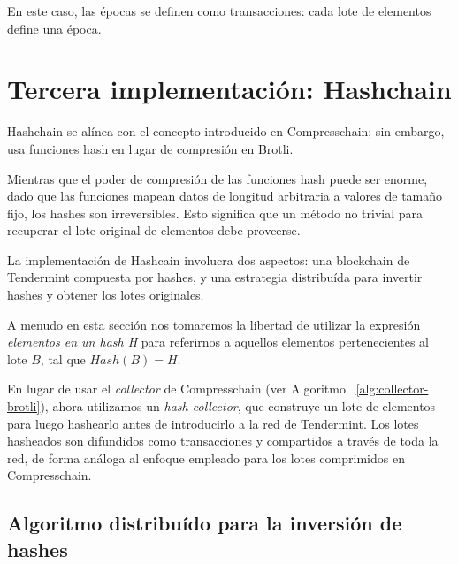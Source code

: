 %
En este caso, las épocas se definen como transacciones: cada lote de elementos define una época.


\section{Tercera implementación: Hashchain}\label{subsec:hashchain}
%
Hashchain se alínea con el concepto introducido en Compresschain; sin embargo, usa
funciones hash en lugar de compresión en Brotli.

%
Mientras que el poder de compresión de las funciones hash puede ser enorme, dado que las funciones
mapean datos de longitud arbitraria a valores de tamaño fijo, los hashes son irreversibles. Esto
significa que un método no trivial para recuperar el lote original de elementos debe proveerse.

%
La implementación de Hashcain involucra dos aspectos: una blockchain de Tendermint compuesta por hashes,
y una estrategia distribuída para invertir hashes y obtener los lotes originales.
%

A menudo en esta sección nos tomaremos la libertad de utilizar la expresión \textit{elementos en un hash H}
para referirnos a aquellos elementos pertenecientes al lote $B$, tal que $Hash(B) = H$.

En lugar de usar el \textit{collector} de Compresschain (ver Algoritmo ~\ref{alg:collector-brotli}),
ahora utilizamos un \textit{hash collector}, que construye un lote de elementos para luego hashearlo
antes de introducirlo a la red de Tendermint.
%
Los lotes hasheados son difundidos como transacciones y compartidos a través de toda la red, de forma
análoga al enfoque empleado para los lotes comprimidos en Compresschain.

\subsection{Algoritmo distribuído para la inversión de hashes}

